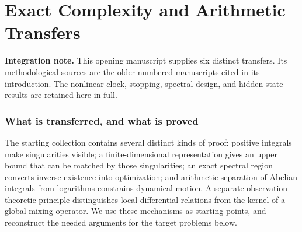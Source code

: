 \documentclass[11pt,a4paper]{article}
\theoremstyle{definition}
\theoremstyle{remark}
\numberwithin{equation}{section}
\newcommand{\collectedpart}[1]{%
 \clearpage\part{#1}%
 \setcounter{section}{0}%
 \renewcommand{\thesection}{\Roman{part}.\arabic{section}}%
 \renewcommand{\theHsection}{p\arabic{part}.s\arabic{section}}%
 \renewcommand{\arraystretch}{1}%
}
\begin{document}
\clearpage
\begingroup\small
\tableofcontents
\endgroup
\clearpage

\collectedpart{Exact Complexity and Arithmetic Transfers}\label{part:1}

\begin{abstract}
We transfer proof mechanisms from recurrence minimality, period arithmetic,
weighted Laplacian spectra, and mixture identification to six concrete
problems. Products of separated central-trinomial moments have exact
recurrence width $\prod_i(m_i+1)$. Jacobi transforms have exact differential
order $N+1$, increasing to $2^N$ under arbitrarily small separated weights
at even nonnegative Dyson index. For every inverse-power spectral loss,
we determine the unique optimal conductances when a matching of links is
forbidden. Holomorphic time differentials imply simultaneous
transcendence of Hamiltonian coordinates at nonzero algebraic-logarithmic
clock times and a harmonic exception for action-quantized energies.
For a mean-reverting square-root diffusion, we verify power-call stopping
for every positive real power, classify algebraic exercise boundaries by
an exact discount resonance, and prove transcendence of zero-state values
at positive integer discount ratios. Finally, a known emission family with
finite-dimensional mixing defect admits hidden-population recovery from
three visits despite unknown persistence; an explicit positive analytic
family shows both the failure of two visits and the sharp risk
$\Theta(\min\{1,(r^2\sqrt{N})^{-1}\})$ on a specified submodel.
The proofs identify the assumptions and classical inputs of each transfer.
\end{abstract}

\noindent\textbf{Integration note.} This opening manuscript supplies six distinct transfers. Its methodological sources are the older numbered manuscripts cited in its introduction. The nonlinear clock, stopping, spectral-design, and hidden-state results are retained here in full.
\clearpage

\section{What is transferred, and what is proved}
The starting collection contains several distinct kinds of proof: positive
integrals make singularities visible; a finite-dimensional representation
gives an upper bound that can be matched by those singularities; an exact
spectral region converts inverse existence into optimization; and arithmetic
separation of Abelian integrals from logarithms constrains dynamical motion.
A separate observation-theoretic principle distinguishes local differential
relations from the kernel of a global mixing operator. We use these mechanisms
as starting points, and reconstruct the needed arguments for the target
problems below.
\end{document}

